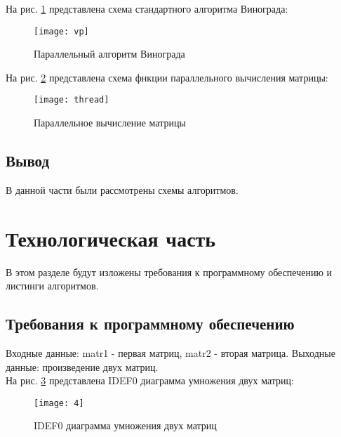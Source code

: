 \documentclass[a4paper, 14pt]{article}
\begin{document}
	\newpage
	На рис. \ref{fig:pv} представлена схема стандартного алгоритма Винограда:	
	
	\begin{figure}[H]
        	\begin{center}
        		\texttt{[image: vp]}
        		\caption{Параллельный алгоритм Винограда}
        		\label{fig:pv}
        	\end{center}
        \end{figure}
	
	\newpage
	На рис. \ref{fig:func} представлена схема фнкции параллельного вычисления матрицы:
	
	\begin{figure}[H]
        	\begin{center}
        		\texttt{[image: thread]}
        		\caption{Параллельное вычисление матрицы}
        		\label{fig:func}
        	\end{center}
        \end{figure}
	
	\subsection{Вывод}
	
	В данной части были рассмотрены схемы алгоритмов.

	\newpage
	\section{Технологическая часть}
	
	В этом разделе будут изложены требования к программному обеспечению и листинги алгоритмов.
	
	\subsection{Требования к программному обеспечению}
	Входные данные: matr1 - первая матриц, matr2 - вторая матрица.
	Выходные данные: произведение двух матриц.\\
	
	На рис. \ref{fig:def} представлена IDEF0 диаграмма умножения двух матриц:
	
	\begin{figure}[H]
        	\begin{center}
        		\texttt{[image: 4]}
        		\caption{IDEF0 диаграмма умножения двух матриц}
        		\label{fig:def}
        	\end{center}
        \end{figure}
	
\end{document}
